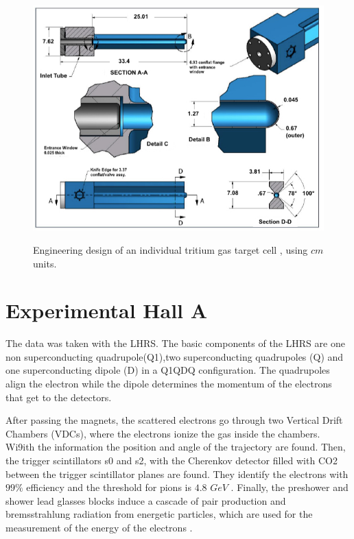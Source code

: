 \documentclass[final,5p,times,twocolumn,balance]{elsarticle}
\begin{document}
\begin{figure}[!h]
\centering
  \includegraphics[width=13cm]{images/tritium_cell.jpg}\\
  \caption{Engineering design of an individual tritium gas target cell \cite{celldes}, using $cm$ units.
 }\label{cell}
\end{figure}


\section{Experimental Hall A}

The data was taken with the LHRS. The basic components of the LHRS are
one non superconducting quadrupole(Q1),two superconducting quadrupoles (Q) and one superconducting dipole (D) in a Q1QDQ configuration. The quadrupoles align the electron while the dipole determines the momentum of the electrons that get to the detectors.

After passing the magnets, the scattered electrons go through two Vertical Drift Chambers (VDCs), where the electrons ionize the gas inside the chambers. Wi9ith the information the position and angle of the trajectory are found. Then, the trigger scintillators s0 and s2, with the Cherenkov detector filled with CO2 between the trigger scintillator planes are found. They identify the electrons with $99 \%$  efficiency and the threshold for pions is $4.8$ $GeV$ . Finally, the preshower and shower lead glasses blocks induce a cascade of pair production and bremsstrahlung radiation from energetic particles, which are used for the measurement of the energy of the electrons \cite{Alcorn:2004sb}.
\end{document}
